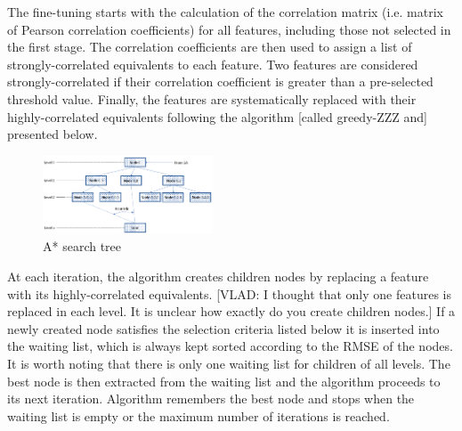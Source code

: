 \documentclass[aps,prl,reprint,amsmath,amssymb,nature]{revtex4-1}
\begin{document}
The fine-tuning starts with the calculation of the correlation matrix (i.e. matrix of Pearson correlation coefficients) for all features, including those not selected in the first stage. 
The correlation coefficients are then used to assign a list of strongly-correlated equivalents to each feature. Two features are considered strongly-correlated if their correlation coefficient is greater than a pre-selected threshold value. 
Finally, the features are systematically replaced with their highly-correlated equivalents following the algorithm [called greedy-ZZZ and] presented below. 

\begin{figure}
\includegraphics[width=0.45\textwidth]{media/water_distances_3.eps}
\caption{A* search tree}\label{Fig:A_star_tree}
\end{figure}

At each iteration, the algorithm creates children nodes by replacing a feature with its highly-correlated equivalents. [VLAD: I thought that only one features is replaced in each level. It is unclear how exactly do you create children nodes.] If a newly created node satisfies the selection criteria listed below it is inserted into the waiting list, which is always kept sorted according to the RMSE of the nodes. It is worth noting that there is only one waiting list for children of all levels. The best node is then extracted from the waiting list and the algorithm proceeds to its next iteration. Algorithm remembers the best node and stops when the waiting list is empty or the maximum number of iterations is reached.
\end{document}

